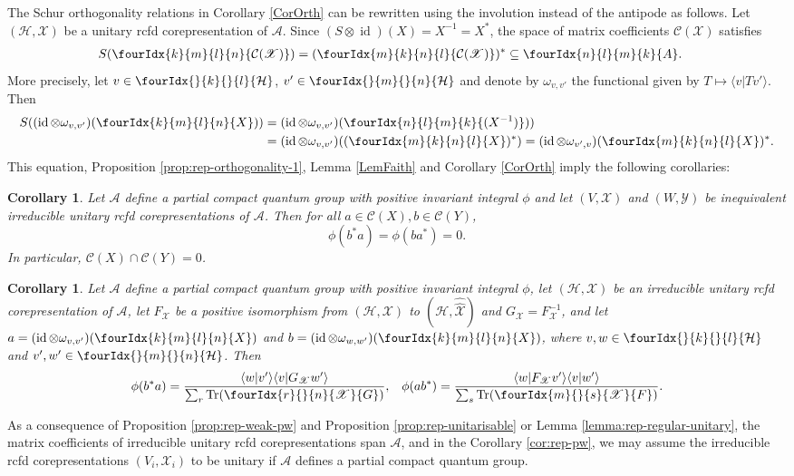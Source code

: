 \documentclass[10pt]{article}
\DeclareMathOperator{\id}{id}
\newcommand{\dualco}[1]{\hat{#1}}
\newcommand{\Hsp}{\mathcal{H}}
\newcommand{\Tr}{\mathrm{Tr}}
\newcommand{\Gr}[5]{\fourIdx{#2}{#4}{#3}{#5}{#1}}%
\newcommand{\Gru}[3]{\Gr{#1}{}{}{#2}{#3}}
\newtheorem{Cor}[Theorem]{Corollary}
\theoremstyle{definition}
\numberwithin{equation}{section}
\begin{document}
The Schur orthogonality relations in Corollary \ref{CorOrth} can be
rewritten using the involution instead of the antipode as follows.
Let $(\Hsp,\mathscr{X})$ be a unitary rcfd corepresentation of
$\mathscr{A}$. Since $(S\otimes \id)(X)=X^{-1}=X^{*}$, the space of
matrix coefficients $\mathcal{C}(\mathscr{X})$ satisfies
\begin{align} \label{eq:rep-unitary-matrix-coefficients}
  S(\Gr{\mathcal{C}(\mathscr{X})}{k}{l}{m}{n}) &=
  (\Gr{\mathcal{C}(\mathscr{X})}{m}{n}{k}{l})^{*} \subseteq \Gr{A}{n}{m}{l}{k}.
\end{align}
More precisely, let $v \in \Gru{\Hsp}{k}{l}$, $v' \in \Gru{\Hsp}{m}{n}$
and denote by $\omega_{v,v'}$ the functional
given by $T \mapsto \langle v|Tv'\rangle$. Then
\begin{align*}
  S((\id \otimes \omega_{v,v'})(\Gr{X}{k}{l}{m}{n})) &=
  (\id \otimes \omega_{v,v'}) (\Gr{(X^{-1})}{n}{m}{l}{k})) \\ & =
  (\id \otimes \omega_{v,v'})( (\Gr{X}{m}{n}{k}{l})^{*}) =
  (\id \otimes \omega_{v',v})(\Gr{X}{m}{n}{k}{l})^{*}.
\end{align*}
This equation, Proposition \ref{prop:rep-orthogonality-1},  Lemma
\ref{LemFaith} and
Corollary \ref{CorOrth} imply the following
corollaries:
\begin{Cor} \label{cor:rep-unitary-orthogonality-1}   Let $\mathscr{A}$ define a partial compact quantum group with
  positive invariant integral $\phi$ and let   $(V,\mathscr{X})$ and
  $(W,\mathscr{Y})$ be inequivalent irreducible unitary rcfd
  corepresentations of $\mathcal{A}$.  Then for all $a\in
  \mathcal{C}(X), b \in \mathcal{C}(Y)$,
  \[\phi(b^{*}a) = \phi(ba^{*})=0.\] In particular, $\mathcal{C}(X)
  \cap \mathcal{C}(Y)=0$.
\end{Cor}
\begin{Cor}\label{cor:rep-unitary-schur-orthogonality}
  Let $\mathscr{A}$ define a partial compact quantum group with
  positive invariant integral $\phi$, let $(\Hsp,\mathscr{X})$ be an irreducible
  unitary rcfd corepresentation of $\mathscr{A}$, let $F_{\mathscr{X}}$ be a positive
  isomorphism from $(\Hsp,\mathscr{X})$ to
  $(\Hsp,\dualco{\dualco{\mathscr{X}}})$ and
  $G_{\mathscr{X}}=F^{-1}_{{\mathscr{X}}}$, and let $a=(\id \otimes
  \omega_{v,v'})(\Gr{X}{k}{l}{m}{n})$ and $b=(\id \otimes
  \omega_{w,w'})(\Gr{X}{k}{l}{m}{n})$, where $v,w \in
  \Gru{\Hsp}{k}{l}$ and $v',w' \in \Gru{\Hsp}{m}{n}$.  Then
\begin{align*}
  \phi(b^{*}a) &= \frac{\langle w|v'\rangle\langle v|G_{\mathscr{X}}w'\rangle}{\sum_{r}
    \Tr(\Gr{G}{r}{n}{}{\mathscr{X}})}, & \phi(ab^{*}) = \frac{\langle
    w|F_{\mathscr{X}}v'\rangle \langle v|w'\rangle}{\sum_{s}
    \Tr(\Gr{F}{m}{s}{}{\mathscr{X}})}.
\end{align*}
\end{Cor}
As a consequence of Proposition \ref{prop:rep-weak-pw} and Proposition
\ref{prop:rep-unitarisable} or Lemma \ref{lemma:rep-regular-unitary},
the matrix coefficients of irreducible unitary rcfd corepresentations
span $\mathscr{A}$, and in the Corollary \ref{cor:rep-pw}, we may
assume the irreducible rcfd corepresentations
$(V_{i},\mathscr{X}_{i})$ to be unitary if $\mathscr{A}$
defines a partial compact quantum group.
\end{document}

